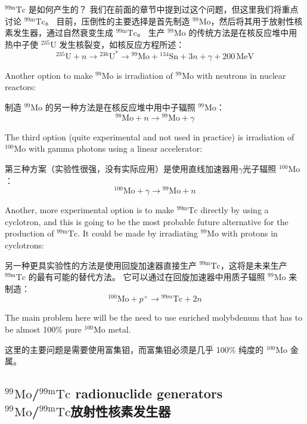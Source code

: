 \documentclass[dvipsnames, svgnames,a4paper,11pt]{article}
\begin{document}
${}^\mathrm{99m}\mathrm{Tc}$ 是如何产生的？ 我们在前面的章节中提到过这个问题，但这里我们将重点讨论 ${}^\mathrm{99m}\mathrm{Tc}$。 目前，压倒性的主要选择是首先制造 ${}^\mathrm{99}\mathrm{Mo}$，然后将其用于放射性核素发生器，通过自然衰变生成 ${}^\mathrm{99m}\mathrm{Tc}$。 生产 ${}^\mathrm{99}\mathrm{Mo}$ 的传统方法是在核反应堆中用热中子使 $\mathrm{{}^{235}U}$ 发生核裂变，如核反应方程所述：
$$
      {}^{235}\text{U} + n \rightarrow {}^{236}\text{U}^* \rightarrow {}^{99}\text{Mo} + {}^{134}\text{Sn} + 3n + \gamma + 200 \, \text{MeV}
$$

Another option to make ${}^\mathrm{99}\mathrm{Mo}$ is irradiation of ${}^\mathrm{99}\mathrm{Mo}$ with neutrons in nuclear reactors:

制造 ${}^\mathrm{99}\mathrm{Mo}$ 的另一种方法是在核反应堆中用中子辐照 ${}^\mathrm{99}\mathrm{Mo}$：
$$
      {}^{98}\text{Mo} + n \rightarrow {}^{99}\text{Mo} + \gamma
$$

The third option (quite experimental and not used in practice) is irradiation of $\mathrm{{}^{100}Mo}$
with gamma photons using a linear accelerator:

第三种方案（实验性很强，没有实际应用）是使用直线加速器用$\gamma$光子辐照 $\mathrm{{}^{100}Mo}$：
$$
      {}^{100}\text{Mo} + \gamma \rightarrow {}^{99}\text{Mo} + n
$$

Another, more experimental option is to make ${}^\mathrm{99m}\mathrm{Tc}$ directly by using a cyclotron,
and this is going to be the most probable future alternative for the production of ${}^\mathrm{99m}\mathrm{Tc}$.
It could be made by irradiating ${}^\mathrm{99}\mathrm{Mo}$ with protons in cyclotrons:

另一种更具实验性的方法是使用回旋加速器直接生产 ${}^\mathrm{99m}\mathrm{Tc}$，这将是未来生产 ${}^\mathrm{99m}\mathrm{Tc}$ 的最有可能的替代方法。 它可以通过在回旋加速器中用质子辐照 ${}^\mathrm{99}\mathrm{Mo}$ 来制造：
$$
      {}^{100}\text{Mo} + p^+ \rightarrow {}^{99m}\text{Tc} + 2n
$$

The main problem here will be the need to use enriched molybdenum that has to be
almost 100\% pure $\mathrm{{}^{100}Mo}$ metal.

这里的主要问题是需要使用富集钼，而富集钼必须是几乎 100\% 纯度的 $\mathrm{{}^{100}Mo}$ 金属。
\subsection{${}^\mathrm{99}\mathrm{Mo}$/${}^\mathrm{99m}\mathrm{Tc}$ radionuclide generators \\${}^\mathrm{99}\mathrm{Mo}$/${}^\mathrm{99m}\mathrm{Tc}$放射性核素发生器}
\end{document}
